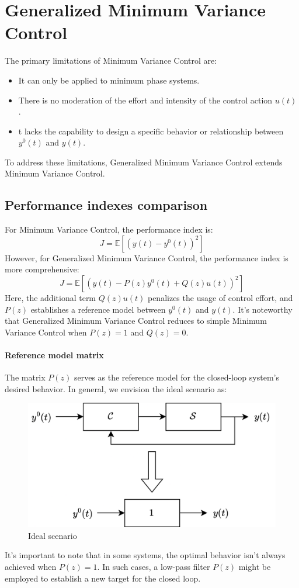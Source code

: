 \section{Generalized Minimum Variance Control}

The primary limitations of Minimum Variance Control are:
\begin{itemize}
    \item It can only be applied to minimum phase systems.
    \item There is no moderation of the effort and intensity of the control action $u(t)$. 
    \item t lacks the capability to design a specific behavior or relationship between $y^{0}(t)$ and $y(t)$. 
\end{itemize}
To address these limitations, Generalized Minimum Variance Control extends Minimum Variance Control.

\subsection{Performance indexes comparison}
For Minimum Variance Control, the performance index is:
\[J=\mathbb{E}\left[\left(y(t)-y^{0}(t)\right)^2\right]\]
However, for Generalized Minimum Variance Control, the performance index is more comprehensive:
\[J=\mathbb{E}\left[\left(y(t)-P(z)y^{0}(t)+Q(z)u(t)\right)^2\right]\]
Here, the additional term $Q(z)u(t)$ penalizes the usage of control effort, and $P(z)$ establishes a reference model between $y^{0}(t)$ and $y(t)$. 
It's noteworthy that Generalized Minimum Variance Control reduces to simple Minimum Variance Control when $P(z)=1$ and $Q(z)=0$. 

\paragraph*{Reference model matrix}
The matrix $P(z)$ serves as the reference model for the closed-loop system's desired behavior. 
In general, we envision the ideal scenario as:
\begin{figure}[H]
    \centering
    \includegraphics[width=0.5\linewidth]{images/p.png}
    \caption{Ideal scenario}
\end{figure}
It's important to note that in some systems, the optimal behavior isn't always achieved when $P(z)=1$. 
In such cases, a low-pass filter $P(z)$ might be employed to establish a new target for the closed loop.

